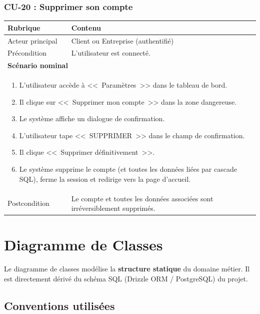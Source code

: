 \documentclass[12pt,a4paper]{article}
\begin{document}
\subsubsection{CU-20 : Supprimer son compte}
\begin{table}[h!]
\centering
\begin{tabular}{p{3.5cm}p{10cm}}
\toprule
\textbf{Rubrique} & \textbf{Contenu} \\
\midrule
Acteur principal & Client ou Entreprise (authentifié) \\
Précondition & L'utilisateur est connecté. \\
\midrule
\multicolumn{2}{l}{\textbf{Scénario nominal}} \\
\midrule
\multicolumn{2}{p{14cm}}{%
\begin{enumerate}[nosep]
    \item L'utilisateur accède à <<~Paramètres~>> dans le tableau de bord.
    \item Il clique sur <<~Supprimer mon compte~>> dans la zone dangereuse.
    \item Le système affiche un dialogue de confirmation.
    \item L'utilisateur tape <<~SUPPRIMER~>> dans le champ de confirmation.
    \item Il clique <<~Supprimer définitivement~>>.
    \item Le système supprime le compte (et toutes les données liées par cascade SQL), ferme la session et redirige vers la page d'accueil.
\end{enumerate}} \\
\midrule
Postcondition & Le compte et toutes les données associées sont irréversiblement supprimés. \\
\bottomrule
\end{tabular}
\end{table}

\newpage
\section{Diagramme de Classes}

Le diagramme de classes modélise la \textbf{structure statique} du domaine métier. Il est directement dérivé du schéma SQL (Drizzle ORM / PostgreSQL) du projet.

\subsection{Conventions utilisées}
\end{document}
